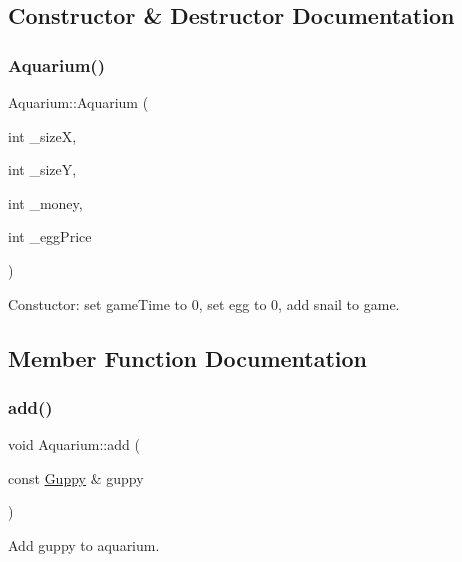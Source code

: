 \subsection{Constructor \& Destructor Documentation}
\mbox{\label{class_aquarium_a62a4dae7e6f07cb1b753ac87c0dd90e0}} 
\subsubsection{\texorpdfstring{Aquarium()}{Aquarium()}}
{\footnotesize\ttfamily Aquarium\+::\+Aquarium (\begin{DoxyParamCaption}\item[{int}]{\+\_\+sizeX,  }\item[{int}]{\+\_\+sizeY,  }\item[{int}]{\+\_\+money,  }\item[{int}]{\+\_\+egg\+Price }\end{DoxyParamCaption})}



Constuctor\+: set game\+Time to 0, set egg to 0, add snail to game. 



\subsection{Member Function Documentation}
\mbox{\label{class_aquarium_a320872320862a83e64bc85b895efc21f}} 
\subsubsection{\texorpdfstring{add()}{add()}\hspace{0.1cm}{\footnotesize\ttfamily [1/5]}}
{\footnotesize\ttfamily void Aquarium\+::add (\begin{DoxyParamCaption}\item[{const \mbox{\hyperlink{class_guppy}{Guppy}} \&}]{guppy }\end{DoxyParamCaption})}



Add guppy to aquarium. 

\mbox{\label{class_aquarium_ad9d2de6ec229fdcdec009bc9a641fe98}} 

